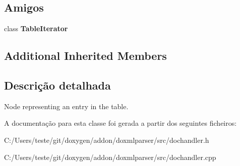 \subsection*{Amigos}
\begin{DoxyCompactItemize}
\item 
\hypertarget{class_table_handler_ab0165532e287d023758cc64c24e40fb7}{class {\bfseries Table\-Iterator}}\label{class_table_handler_ab0165532e287d023758cc64c24e40fb7}

\end{DoxyCompactItemize}
\subsection*{Additional Inherited Members}


\subsection{Descrição detalhada}
Node representing an entry in the table. 



A documentação para esta classe foi gerada a partir dos seguintes ficheiros\-:\begin{DoxyCompactItemize}
\item 
C\-:/\-Users/teste/git/doxygen/addon/doxmlparser/src/dochandler.\-h\item 
C\-:/\-Users/teste/git/doxygen/addon/doxmlparser/src/dochandler.\-cpp\end{DoxyCompactItemize}

